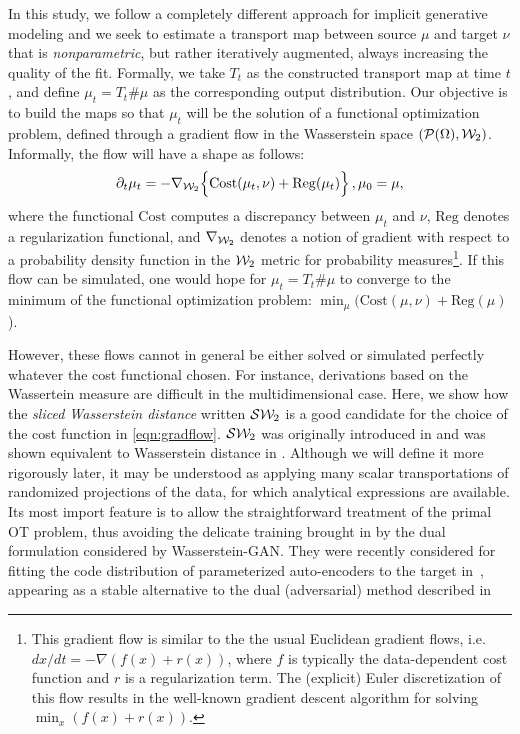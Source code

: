 In this study, we follow a completely different approach for implicit generative modeling and we seek to estimate a transport map between source $\mu$ and target $\nu$ that is \textit{nonparametric}, but rather iteratively augmented, always increasing the quality of the fit. Formally, we take $T_t$ as the constructed transport map at time $t$, and define $\mu_t=T_t \# \mu$ as the corresponding output distribution. Our objective is to build the maps so that $\mu_t$ will be the solution of a functional optimization problem, defined through a gradient flow in the Wasserstein space $({\cal P}(\Omega),{\cal W}_2)$. Informally, the flow will have a shape as follows:
\begin{align}
\partial_t \mu_t = - \nabla_{{\cal W}_2} \Bigl\{ \mathrm{Cost}(\mu_t, \nu) + \mathrm{Reg}(\mu_t)\Bigr\} \, , \mu_0 = \mu,\label{eqn:gradflow}
\end{align}
where the functional $\mathrm{Cost}$ computes a discrepancy between $\mu_t$ and $\nu$, $\mathrm{Reg}$ denotes a regularization functional, and $\nabla_{{\cal W}_2}$ denotes a notion of gradient with respect to a probability density function in the ${\cal W}_2$ metric for probability measures\footnote{This gradient flow is similar to the the usual Euclidean gradient flows, i.e.\ $dx/dt = - \nabla (f(x) + r(x))$, where $f$ is typically the data-dependent cost function and $r$ is a regularization term. The (explicit) Euler discretization of this flow results in the well-known gradient descent algorithm for solving $\min_x (f(x)+r(x))$.}. If this flow can be simulated, one would hope for $\mu_t=T_t\#\mu$ to converge to the minimum of the functional optimization problem: $\min_\mu ( \mathrm{Cost}(\mu, \nu) + \mathrm{Reg}(\mu)$).

However, these flows cannot in general be either solved or simulated perfectly whatever the cost functional chosen. For instance, derivations based on the Wassertein measure are difficult in the multidimensional case.  Here, we show how the \textit{sliced Wasserstein distance} written ${\cal S}{\cal W}_2$ is a good candidate for the choice of the cost function in \eqref{eqn:gradflow}. ${\cal S}{\cal W}_2$ was originally introduced in \cite{pitie2005n} and was shown equivalent to Wasserstein distance in \cite{bonnotte2013unidimensional}. Although we will define it more rigorously later, it may be understood as applying many scalar transportations of randomized projections of the data, for which analytical expressions are available. Its most import feature is to allow the straightforward treatment of the primal OT problem, thus avoiding the delicate training brought in by the dual formulation considered by Wasserstein-GAN. They were recently considered for fitting the code distribution of parameterized auto-encoders to the target in~\cite{kolouri2018sliced}, appearing as a stable alternative to the dual (adversarial) method described in~\cite{makhzani2015adversarial}

